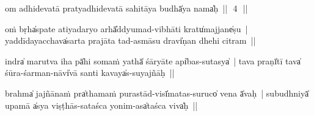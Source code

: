 \documentclass[parskip, DIV=14]{scrartcl}
\begin{document}

om adhidevatā pratyadhidevatā sahitāya budhā̍ya॒ nama̍ḥ~||~\,4\,~||
\vspace{0.5cm}


oṁ bṛha̍spate॒॒ ati॒yada॒ryo arhā̎ddyu॒mad-vi॒bhāti॒ kratu̍ma॒jjane̍ṣu~| yaddī॒daya॒cchava̍sarta prajāta॒ tad-a॒smāsu॒ dravi̍ṇan dhehi ci॒tram~||


indra̍ marutva i॒ha pā̍hi॒ soma॒ṁ yathā̍ śāryā॒॒te api̍bas-su॒tasya̍~| tava॒ praṇī̍tī॒ tava̍ śūra॒-śarma॒n-nāvi̍vā santi ka॒vaya̍s-suya॒jñāḥ~||


brahma̍ jajñā॒॒naṁ pra̍tha॒maṁ pu॒rastā॒॒d-visī̍ma॒tas-su॒ruco̍ ve॒॒na ā̍vaḥ~| subu॒dhniyā̍ upa॒mā a̍sya vi॒ṣṭhās-sa॒taśca॒ yoni॒m-asa̍taśca॒ viva̍ḥ~||

\end{document}
